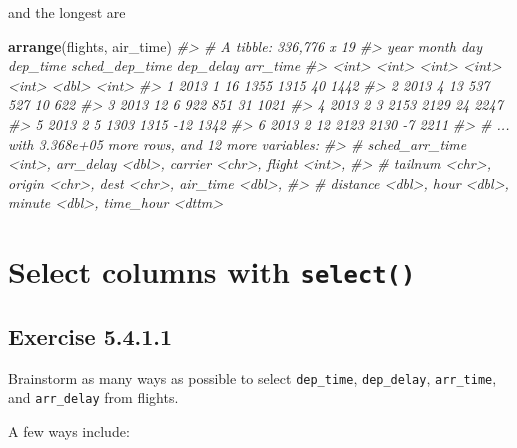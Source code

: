 \documentclass[]{book}
\newenvironment{Shaded}{\begin{snugshade}}{\end{snugshade}}
\newcommand{\CommentTok}[1]{\textcolor[rgb]{0.56,0.35,0.01}{\textit{#1}}}
\newcommand{\KeywordTok}[1]{\textcolor[rgb]{0.13,0.29,0.53}{\textbf{#1}}}
\newcommand{\NormalTok}[1]{#1}
\theoremstyle{plain}
\theoremstyle{remark}
\begin{document}
and the longest are

\begin{Shaded}
\begin{Highlighting}[]
\KeywordTok{arrange}\NormalTok{(flights, air_time)}
\CommentTok{#> # A tibble: 336,776 x 19}
\CommentTok{#>    year month   day dep_time sched_dep_time dep_delay arr_time}
\CommentTok{#>   <int> <int> <int>    <int>          <int>     <dbl>    <int>}
\CommentTok{#> 1  2013     1    16     1355           1315        40     1442}
\CommentTok{#> 2  2013     4    13      537            527        10      622}
\CommentTok{#> 3  2013    12     6      922            851        31     1021}
\CommentTok{#> 4  2013     2     3     2153           2129        24     2247}
\CommentTok{#> 5  2013     2     5     1303           1315       -12     1342}
\CommentTok{#> 6  2013     2    12     2123           2130        -7     2211}
\CommentTok{#> # ... with 3.368e+05 more rows, and 12 more variables:}
\CommentTok{#> #   sched_arr_time <int>, arr_delay <dbl>, carrier <chr>, flight <int>,}
\CommentTok{#> #   tailnum <chr>, origin <chr>, dest <chr>, air_time <dbl>,}
\CommentTok{#> #   distance <dbl>, hour <dbl>, minute <dbl>, time_hour <dttm>}
\end{Highlighting}
\end{Shaded}

\hypertarget{select-columns-with-select}{%
\section{\texorpdfstring{Select columns with \texttt{select()}}{Select columns with select()}}\label{select-columns-with-select}}

\hypertarget{exercise-5.4.1.1}{%
\subsection*{\texorpdfstring{Exercise {5.4.1.1}}{Exercise 5.4.1.1}}\label{exercise-5.4.1.1}}

Brainstorm as many ways as possible to select \texttt{dep\_time}, \texttt{dep\_delay}, \texttt{arr\_time}, and \texttt{arr\_delay} from flights.

A few ways include:
\end{document}
